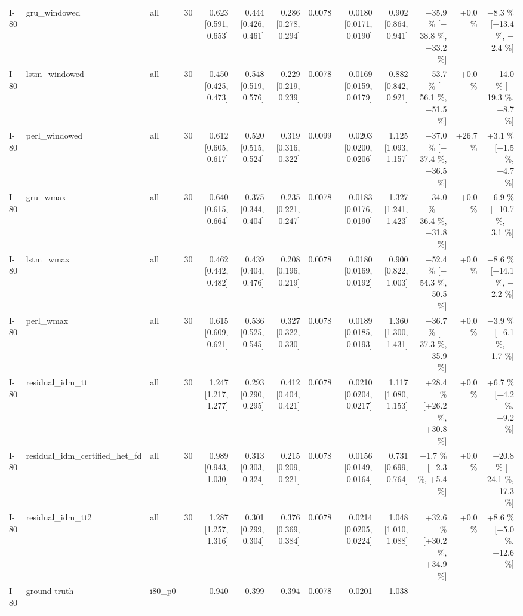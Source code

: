 \begin{table}[htbp]
{\begin{tabular}{lllrrrrrrrrrr}
I-80 & gru\_windowed & all & 30 & 0.623 [0.591, 0.653] & 0.444 [0.426, 0.461] & 0.286 [0.278, 0.294] & 0.0078 & 0.0180 [0.0171, 0.0190] & 0.902 [0.864, 0.941] & $-$35.9 \% [$-$38.8 \%, $-$33.2 \%] & +0.0 \% & $-$8.3 \% [$-$13.4 \%, $-$2.4 \%] \\
I-80 & lstm\_windowed & all & 30 & 0.450 [0.425, 0.473] & 0.548 [0.519, 0.576] & 0.229 [0.219, 0.239] & 0.0078 & 0.0169 [0.0159, 0.0179] & 0.882 [0.842, 0.921] & $-$53.7 \% [$-$56.1 \%, $-$51.5 \%] & +0.0 \% & $-$14.0 \% [$-$19.3 \%, $-$8.7 \%] \\
I-80 & perl\_windowed & all & 30 & 0.612 [0.605, 0.617] & 0.520 [0.515, 0.524] & 0.319 [0.316, 0.322] & 0.0099 & 0.0203 [0.0200, 0.0206] & 1.125 [1.093, 1.157] & $-$37.0 \% [$-$37.4 \%, $-$36.5 \%] & +26.7 \% & +3.1 \% [+1.5 \%, +4.7 \%] \\
I-80 & gru\_wmax & all & 30 & 0.640 [0.615, 0.664] & 0.375 [0.344, 0.404] & 0.235 [0.221, 0.247] & 0.0078 & 0.0183 [0.0176, 0.0190] & 1.327 [1.241, 1.423] & $-$34.0 \% [$-$36.4 \%, $-$31.8 \%] & +0.0 \% & $-$6.9 \% [$-$10.7 \%, $-$3.1 \%] \\
I-80 & lstm\_wmax & all & 30 & 0.462 [0.442, 0.482] & 0.439 [0.404, 0.476] & 0.208 [0.196, 0.219] & 0.0078 & 0.0180 [0.0169, 0.0192] & 0.900 [0.822, 1.003] & $-$52.4 \% [$-$54.3 \%, $-$50.5 \%] & +0.0 \% & $-$8.6 \% [$-$14.1 \%, $-$2.2 \%] \\
I-80 & perl\_wmax & all & 30 & 0.615 [0.609, 0.621] & 0.536 [0.525, 0.545] & 0.327 [0.322, 0.330] & 0.0078 & 0.0189 [0.0185, 0.0193] & 1.360 [1.300, 1.431] & $-$36.7 \% [$-$37.3 \%, $-$35.9 \%] & +0.0 \% & $-$3.9 \% [$-$6.1 \%, $-$1.7 \%] \\
I-80 & residual\_idm\_tt & all & 30 & 1.247 [1.217, 1.277] & 0.293 [0.290, 0.295] & 0.412 [0.404, 0.421] & 0.0078 & 0.0210 [0.0204, 0.0217] & 1.117 [1.080, 1.153] & +28.4 \% [+26.2 \%, +30.8 \%] & +0.0 \% & +6.7 \% [+4.2 \%, +9.2 \%] \\
I-80 & residual\_idm\_certified\_het\_fd & all & 30 & 0.989 [0.943, 1.030] & 0.313 [0.303, 0.324] & 0.215 [0.209, 0.221] & 0.0078 & 0.0156 [0.0149, 0.0164] & 0.731 [0.699, 0.764] & +1.7 \% [$-$2.3 \%, +5.4 \%] & +0.0 \% & $-$20.8 \% [$-$24.1 \%, $-$17.3 \%] \\
I-80 & residual\_idm\_tt2 & all & 30 & 1.287 [1.257, 1.316] & 0.301 [0.299, 0.304] & 0.376 [0.369, 0.384] & 0.0078 & 0.0214 [0.0205, 0.0224] & 1.048 [1.010, 1.088] & +32.6 \% [+30.2 \%, +34.9 \%] & +0.0 \% & +8.6 \% [+5.0 \%, +12.6 \%] \\
I-80 & ground truth & i80\_p0 &  & 0.940 & 0.399 & 0.394 & 0.0078 & 0.0201 & 1.038 &  &  &  \\

\end{tabular}}
\end{table}
